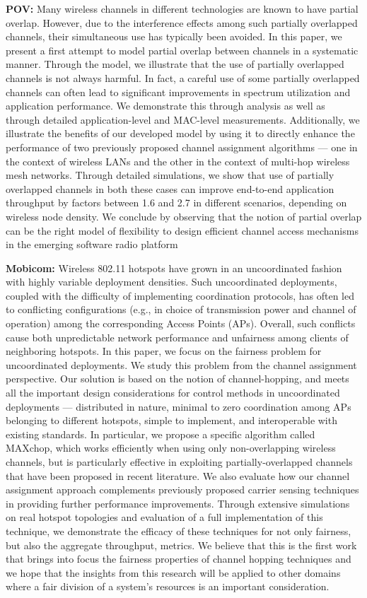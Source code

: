 \documentclass[11pt,letterpaper]{article}
\begin{document}
{\bf POV:}
Many wireless channels in different technologies are known to have
partial overlap. However, due to the interference effects among
such partially overlapped channels, their simultaneous use has typically
been avoided. In this paper, we present a first attempt to model
partial overlap between channels in a systematic manner. Through
the model, we illustrate that the use of partially overlapped channels
is not always harmful. In fact, a careful use of some partially
overlapped channels can often lead to significant improvements in
spectrum utilization and application performance. We demonstrate
this through analysis as well as through detailed application-level
and MAC-level measurements. Additionally, we illustrate the benefits
of our developed model by using it to directly enhance the
performance of two previously proposed channel assignment algorithms
— one in the context of wireless LANs and the other in the
context of multi-hop wireless mesh networks. Through detailed
simulations, we show that use of partially overlapped channels in
both these cases can improve end-to-end application throughput by
factors between 1.6 and 2.7 in different scenarios, depending on
wireless node density. We conclude by observing that the notion
of partial overlap can be the right model of flexibility to design efficient
channel access mechanisms in the emerging software radio
platform


{\bf Mobicom:}
Wireless 802.11 hotspots have grown in an uncoordinated fashion
with highly variable deployment densities. Such uncoordinated
deployments, coupled with the difficulty of implementing
coordination protocols, has often led to conflicting configurations
(e.g., in choice of transmission power and channel of operation)
among the corresponding Access Points (APs). Overall, such conflicts
cause both unpredictable network performance and unfairness
among clients of neighboring hotspots. In this paper, we focus on
the fairness problem for uncoordinated deployments. We study
this problem from the channel assignment perspective. Our solution
is based on the notion of channel-hopping, and meets all
the important design considerations for control methods in uncoordinated
deployments — distributed in nature, minimal to zero
coordination among APs belonging to different hotspots, simple
to implement, and interoperable with existing standards. In particular,
we propose a specific algorithm called MAXchop, which
works efficiently when using only non-overlapping wireless channels,
but is particularly effective in exploiting partially-overlapped
channels that have been proposed in recent literature. We also
evaluate how our channel assignment approach complements previously
proposed carrier sensing techniques in providing further
performance improvements. Through extensive simulations on real
hotspot topologies and evaluation of a full implementation of this
technique, we demonstrate the efficacy of these techniques for not
only fairness, but also the aggregate throughput, metrics.
We believe that this is the first work that brings into focus the
fairness properties of channel hopping techniques and we hope that
the insights from this research will be applied to other domains
where a fair division of a system’s resources is an important consideration.
\end{document}
